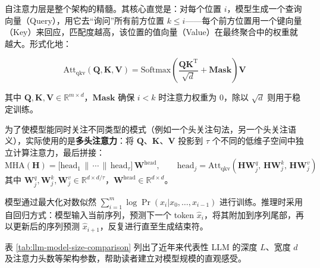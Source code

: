 自注意力层是整个架构的精髓。其核心直觉是：对每个位置 $i$，模型生成一个查询向量（Query），用它去``询问''所有前方位置 $k \le i$——每个前方位置用一个键向量（Key）来回应，匹配度越高，该位置的值向量（Value）在最终聚合中的权重就越大。形式化地：

\begin{equation}
  \mathrm{Att}_{\mathrm{qkv}}(\mathbf{Q},\mathbf{K},\mathbf{V}) =
  \mathrm{Softmax}\!\left(\frac{\mathbf{Q}\mathbf{K}^{\mathrm{T}}}{\sqrt{d}} + \mathbf{Mask}\right)\mathbf{V}
  \label{eq:qkv-attention-lm}
\end{equation}

其中 $\mathbf{Q},\mathbf{K},\mathbf{V} \in \mathbb{R}^{m \times d}$，$\mathbf{Mask}$ 确保 $i < k$ 时注意力权重为 0，除以 $\sqrt{d}$ 则用于稳定训练。

为了使模型能同时关注不同类型的模式（例如一个头关注句法，另一个头关注语义），实际使用的是\textbf{多头注意力}：将 $\mathbf{Q}$、$\mathbf{K}$、$\mathbf{V}$ 投影到 $\tau$ 个不同的低维子空间中独立计算注意力，最后拼接：
\begin{equation}
  \mathrm{MHA}(\mathbf{H}) =
  \big[\mathrm{head}_1 \,\|\, \cdots \,\|\, \mathrm{head}_{\tau}\big]\, \mathbf{W}^{\mathrm{head}},
  \qquad
  \mathrm{head}_j = \mathrm{Att}_{\mathrm{qkv}}(\mathbf{H}\mathbf{W}_j^{q},\,\mathbf{H}\mathbf{W}_j^{k},\,\mathbf{H}\mathbf{W}_j^{v})
  \label{eq:multihead-attention}
\end{equation}
其中 $\mathbf{W}_j^{q},\mathbf{W}_j^{k},\mathbf{W}_j^{v} \in \mathbb{R}^{d \times d/\tau}$，$\mathbf{W}^{\mathrm{head}} \in \mathbb{R}^{d \times d}$。

模型通过最大化对数似然 $\sum_{i=1}^{m} \log \Pr(x_i|x_0,\dots,x_{i-1})$ 进行训练。推理时采用自回归方式：模型输入当前序列，预测下一个 token $\hat{x}_i$，将其附加到序列尾部，再以更新后的序列预测 $\hat{x}_{i+1}$，反复进行直至生成结束符。

表 \ref{tab:llm-model-size-comparison} 列出了近年来代表性 LLM 的深度 $L$、宽度 $d$ 及注意力头数等架构参数，帮助读者建立对模型规模的直观感受。

